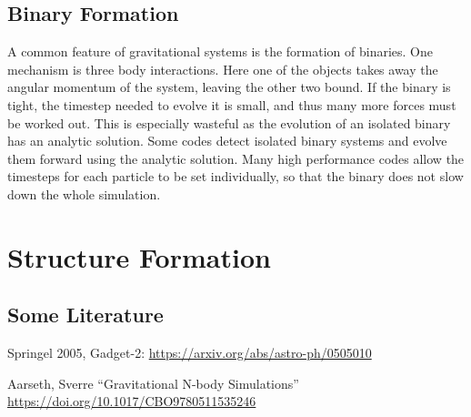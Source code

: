 \documentclass[12pt]{article}
\begin{document}
\subsection{Binary Formation}

A common feature of gravitational systems is the formation of binaries. One mechanism is three body interactions. Here one of the objects takes away the angular momentum of the system, leaving the other two bound. If the binary is tight, the timestep needed to evolve it is small, and thus many more forces must be worked out. This is especially wasteful as the evolution of an isolated binary has an analytic solution. Some codes detect isolated binary systems and evolve them forward using the analytic solution. Many high performance codes allow the timesteps for each particle to be set individually, so that the binary does not slow down the whole simulation.

\section{Structure Formation}

\subsection{Some Literature}

Springel 2005, Gadget-2: \url{https://arxiv.org/abs/astro-ph/0505010}

Aarseth, Sverre ``Gravitational N-body Simulations'' \url{https://doi.org/10.1017/CBO9780511535246}
\end{document}

